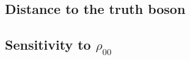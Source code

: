 \subsection{Distance to the truth boson}
\label{app:axes:dr}


\subsection{Sensitivity to $\rho_{00}$}
\label{app:axes:results}

